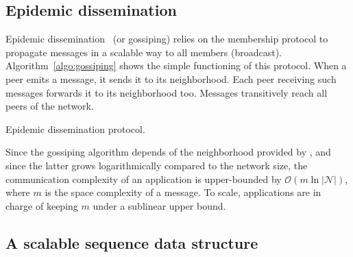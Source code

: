 

\subsection{Epidemic dissemination}
\label{subsec:gossiping}

Epidemic dissemination~\cite{birman1999bimodal,demers1987epidemic} (or
gossiping) relies on the membership protocol to propagate messages in a scalable
way to all members (broadcast).
Algorithm~\ref{algo:gossiping} shows the simple functioning of this
protocol. When a peer emits a message, it sends it to its neighborhood. Each
peer receiving such messages forwards it to its neighborhood too. Messages
transitively reach all peers of the network.

\begin{algorithm}[h]
  
  \caption{\label{algo:gossiping}Epidemic dissemination protocol.}
\end{algorithm}

Since the gossiping algorithm depends of the neighborhood provided by \SPRAY,
and since the latter grows logarithmically compared to the network size, the
communication complexity of an application is upper-bounded by
$\mathcal{O}(m \ln |\mathcal{N}|)$, where $m$ is the space complexity of a
message. To scale, applications are in charge of keeping $m$ under a sublinear
upper bound.




\subsection{A scalable sequence data structure}

